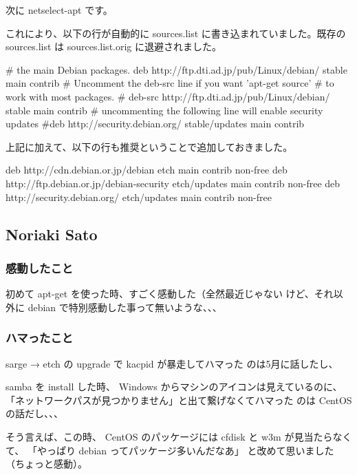 \documentclass[mingoth,a4paper]{jsarticle}
\begin{document}
 次に netselect-apt です。


これにより、以下の行が自動的に sources.list に書き込まれていました。既存の sources.list は
sources.list.orig に退避されました。

\begin{commandline}
 # the main Debian packages.
 deb http://ftp.dti.ad.jp/pub/Linux/debian/ stable main contrib
 # Uncomment the deb-src line if you want 'apt-get source'
 # to work with most packages.
 # deb-src http://ftp.dti.ad.jp/pub/Linux/debian/ stable main contrib
 # uncommenting the following line will enable security updates
 #deb http://security.debian.org/ stable/updates main contrib
\end{commandline}

上記に加えて、以下の行も推奨ということで追加しておきました。

\begin{commandline}
  deb http://cdn.debian.or.jp/debian etch main contrib non-free
 deb http://ftp.debian.or.jp/debian-security etch/updates main contrib
 non-free
 deb http://security.debian.org/ etch/updates main contrib non-free
\end{commandline}

\subsection{Noriaki Sato}

\subsubsection{感動したこと}
初めて apt-get を使った時、すごく感動した（全然最近じゃない
けど、それ以外に debian で特別感動した事って無いような、、、

\subsubsection{ハマったこと}
sarge → etch の upgrade で kacpid が暴走してハマった
のは5月に話したし、

samba を install した時、
Windows からマシンのアイコンは見えているのに、
「ネットワークパスが見つかりません」と出て繋げなくてハマった
のは CentOS の話だし、、、

そう言えば、この時、
CentOS のパッケージには cfdisk と w3m が見当たらなくて、
「やっぱり debian ってパッケージ多いんだなあ」
と改めて思いました（ちょっと感動）。
\end{document}
